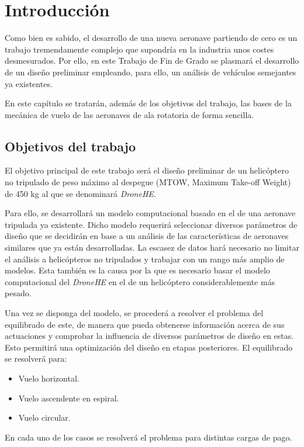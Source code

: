 \chapter{Introducción}

Como bien es sabido, el desarrollo de una nueva aeronave partiendo de cero es un trabajo tremendamente complejo que supondría en la industria unos costes desmesurados. Por ello, en este Trabajo de Fin de Grado se plasmará el desarrollo de un diseño preliminar empleando, para ello, un análisis de vehículos semejantes ya existentes.

En este capítulo se tratarán, además de los objetivos del trabajo, las bases de la mecánica de vuelo de las aeronaves de ala rotatoria de forma sencilla.

\section{Objetivos del trabajo}

El objetivo principal de este trabajo será el diseño preliminar de un helicóptero no tripulado de peso máximo al despegue (MTOW, Maximum Take-off Weight) de 450 kg al que se denominará \emph{DroneHE}.

Para ello, se desarrollará un modelo computacional basado en el de una aeronave tripulada ya existente. Dicho modelo requerirá seleccionar diversos parámetros de diseño que se decidirán en base a un análisis de las características de aeronaves similares que ya están desarrolladas. La escasez de datos hará necesario no limitar el análisis a helicópteros no tripulados y trabajar con un rango más amplio de modelos. Esta también es la causa por la que es necesario basar el modelo computacional del \emph{DroneHE} en el de un helicóptero considerablemente más pesado.

Una vez se disponga del modelo, se procederá a resolver el problema del equilibrado de este, de manera que pueda obtenerse información acerca de sus actuaciones y comprobar la influencia de diversos parámetros de diseño en estas. Esto permitirá una optimización del diseño en etapas posteriores. El equilibrado se resolverá para:
\begin{itemize}
	\item Vuelo horizontal.
	\item Vuelo ascendente en espiral.
	\item Vuelo circular.
\end{itemize}
En cada uno de los casos se resolverá el problema para distintas cargas de pago.


